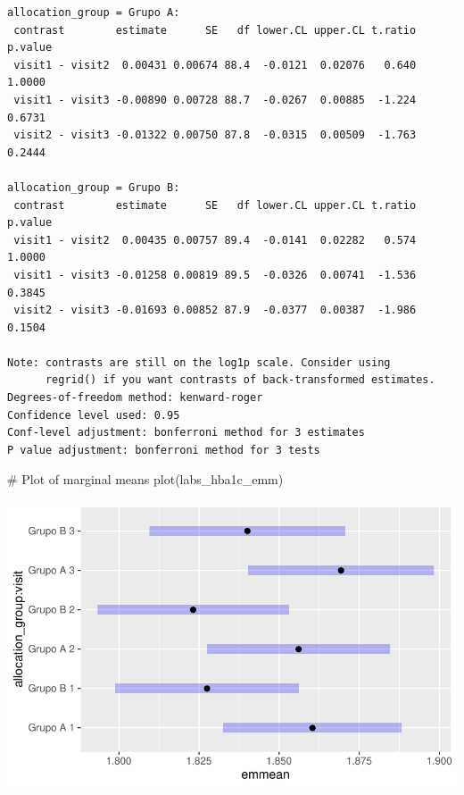 \documentclass[
  letterpaper,
  DIV=11,
  numbers=noendperiod]{scrartcl}
\newenvironment{Shaded}{\begin{snugshade}}{\end{snugshade}}
\newcommand{\CommentTok}[1]{\textcolor[rgb]{0.37,0.37,0.37}{#1}}
\newcommand{\FunctionTok}[1]{\textcolor[rgb]{0.28,0.35,0.67}{#1}}
\newcommand{\NormalTok}[1]{\textcolor[rgb]{0.00,0.23,0.31}{#1}}
\begin{document}
\begin{verbatim}
allocation_group = Grupo A:
 contrast        estimate      SE   df lower.CL upper.CL t.ratio p.value
 visit1 - visit2  0.00431 0.00674 88.4  -0.0121  0.02076   0.640  1.0000
 visit1 - visit3 -0.00890 0.00728 88.7  -0.0267  0.00885  -1.224  0.6731
 visit2 - visit3 -0.01322 0.00750 87.8  -0.0315  0.00509  -1.763  0.2444

allocation_group = Grupo B:
 contrast        estimate      SE   df lower.CL upper.CL t.ratio p.value
 visit1 - visit2  0.00435 0.00757 89.4  -0.0141  0.02282   0.574  1.0000
 visit1 - visit3 -0.01258 0.00819 89.5  -0.0326  0.00741  -1.536  0.3845
 visit2 - visit3 -0.01693 0.00852 87.9  -0.0377  0.00387  -1.986  0.1504

Note: contrasts are still on the log1p scale. Consider using
      regrid() if you want contrasts of back-transformed estimates. 
Degrees-of-freedom method: kenward-roger 
Confidence level used: 0.95 
Conf-level adjustment: bonferroni method for 3 estimates 
P value adjustment: bonferroni method for 3 tests 
\end{verbatim}

\begin{Shaded}
\begin{Highlighting}[]
\CommentTok{\# Plot of marginal means}
\FunctionTok{plot}\NormalTok{(labs\_hba1c\_emm)}
\end{Highlighting}
\end{Shaded}

\includegraphics{Outcomes_V1V2V3_files/figure-pdf/labs_hba1c_sens_emm-1.pdf}
\end{document}
